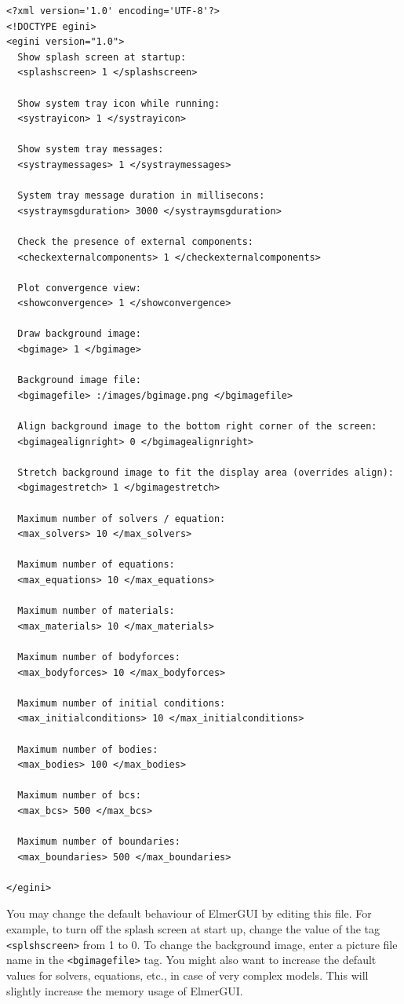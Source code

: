\documentclass[a4paper,12pt]{article}
\begin{document}
\begin{footnotesize}
\begin{verbatim}
<?xml version='1.0' encoding='UTF-8'?>
<!DOCTYPE egini>
<egini version="1.0">
  Show splash screen at startup:
  <splashscreen> 1 </splashscreen>

  Show system tray icon while running:
  <systrayicon> 1 </systrayicon>

  Show system tray messages:
  <systraymessages> 1 </systraymessages>

  System tray message duration in millisecons:
  <systraymsgduration> 3000 </systraymsgduration>

  Check the presence of external components:
  <checkexternalcomponents> 1 </checkexternalcomponents>

  Plot convergence view:
  <showconvergence> 1 </showconvergence>

  Draw background image:
  <bgimage> 1 </bgimage>

  Background image file:
  <bgimagefile> :/images/bgimage.png </bgimagefile>

  Align background image to the bottom right corner of the screen:
  <bgimagealignright> 0 </bgimagealignright>

  Stretch background image to fit the display area (overrides align):
  <bgimagestretch> 1 </bgimagestretch>

  Maximum number of solvers / equation:
  <max_solvers> 10 </max_solvers>

  Maximum number of equations:
  <max_equations> 10 </max_equations>
  
  Maximum number of materials:
  <max_materials> 10 </max_materials>

  Maximum number of bodyforces:
  <max_bodyforces> 10 </max_bodyforces>

  Maximum number of initial conditions:
  <max_initialconditions> 10 </max_initialconditions>

  Maximum number of bodies:
  <max_bodies> 100 </max_bodies>

  Maximum number of bcs:
  <max_bcs> 500 </max_bcs>

  Maximum number of boundaries:
  <max_boundaries> 500 </max_boundaries>

</egini>
\end{verbatim}
\end{footnotesize}

You may change the default behaviour of ElmerGUI by editing this file. For example, to turn off the splash screen at start up, change the value of the tag {\tt <splshscreen>} from 1 to 0. To change the background image, enter a picture file name in the {\tt <bgimagefile>} tag. You might also want to increase the default values for solvers, equations, etc., in case of very complex models. This will slightly increase the memory usage of ElmerGUI.
\end{document}
